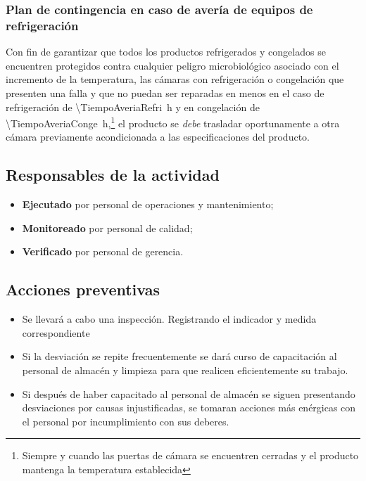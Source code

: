 \subsubsection{Plan de contingencia en caso de avería de equipos de refrigeración}
Con fin de garantizar que todos los productos refrigerados y congelados se encuentren protegidos contra cualquier peligro microbiológico asociado con el incremento de la temperatura, las cámaras con refrigeración o congelación que presenten una falla y que no puedan ser reparadas en menos en el caso de refrigeración de \qty{\TiempoAveriaRefri}{\hour} y en congelación de \qty{\TiempoAveriaConge}{\hour},\footnote{Siempre y cuando las puertas de cámara se encuentren cerradas y el producto mantenga la temperatura establecida} el producto se \emph{debe} trasladar oportunamente a otra cámara previamente acondicionada a las especificaciones del producto.

\subsection{Responsables de la actividad}

\begin{itemize}
	\item \textbf{Ejecutado} por personal de operaciones y mantenimiento;
	\item \textbf{Monitoreado} por personal de calidad;
	\item \textbf{Verificado} por personal de gerencia.
\end{itemize}

\subsection{Acciones preventivas}

\begin{itemize}
	\item Se llevará a cabo una inspección. Registrando el indicador y medida correspondiente
	\item Si la desviación se repite frecuentemente se dará curso de capacitación al personal de almacén y limpieza para que realicen eficientemente su trabajo.
	\item Si después de haber capacitado al personal de almacén se siguen presentando desviaciones por causas injustificadas, se tomaran acciones más enérgicas con el personal por incumplimiento con sus deberes.
\end{itemize}

